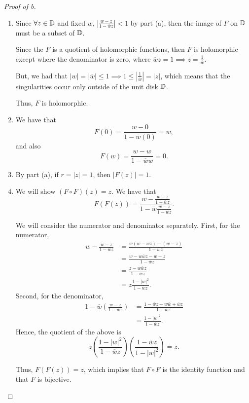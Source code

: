 \documentclass[../hw1]{subfiles}
\begin{document}
\begin{proof}[Proof of b]
	\begin{enumerate}[label=(\roman*)]
		\item Since $\forall z\in \mathbb{D}$ and fixed $w$,  $\left| \frac{w-z}{1-\overline{w}z} \right| <1$ by part (a),
		      then the image of $F$ on  $\mathbb{D}$ must be a subset of $\mathbb{D}$.

		      Since the $F$ is a quotient of holomorphic functions, then $F$ is holomorphic except where the denominator is zero, where $\overline{w}z=1 \implies z=\frac{1}{\overline{w}}$.

		      But, we had that $|w|=|\overline{w}|\le 1 \implies 1\le  \left| \frac{1}{\overline{w}} \right| = |z|$, which means that the singularities occur only outside of the unit disk $\mathbb{D}$.

		      Thus, $F$ is holomorphic.

		\item We have that \[
			      F(0)=\frac{w-0}{1-\overline{w}(0)}=w
			      ,\] and also \[
			      F(w)=\frac{w-w}{1-\overline{w}w}=0
			      .\]

		\item By part (a), if $r=|z|=1$, then  $|F(z)|=1$.
		\item We will show $(F\circ F)(z)=z$.
		      We have that \[
			      F(F(z)) = \frac{w-\frac{w-z}{1-\overline{w}z}}{1-\overline{w}\frac{w-z}{1-\overline{w}z}}
			      .\]

		      We will consider the numerator and denominator separately.
		      First, for the numerator,
		      \begin{align*}
			      w-\frac{w-z}{1-\overline{w}z} & = \frac{ w(w-\overline{w}z)-(w-z) }{1-\overline{w}z} \\
			                                    & = \frac{w-w\overline{w}z-w+z}{1-\overline{w}z}       \\
			                                    & = \frac{z-w\overline{w}z}{1-\overline{w}z}           \\
			                                    & = z\frac{1-|w|^2}{1-\overline{w}z}
			      .\end{align*}
		      Second, for the denominator,
		      \begin{align*}
			      1-\overline{w}\left( \frac{w-z}{1-\overline{w}z} \right) & = \frac{1-\overline{w}z-w\overline{w}+\overline{w}z}{1-\overline{w}z} \\
			                                                               & = \frac{1-|w|^2}{1-\overline{w}z}
			      .\end{align*}
		      Hence, the quotient of the above is \[
			      z\left( \frac{1-|w|^2}{1-\overline{w}z} \right) \left( \frac{1-\overline{w}z}{1-|w|^2} \right) = z
			      .\]

		      Thus, $F(F(z))=z$, which implies that $F \circ F$ is the identity function and that $F$ is bijective.
	\end{enumerate}
\end{proof}
\end{document}
